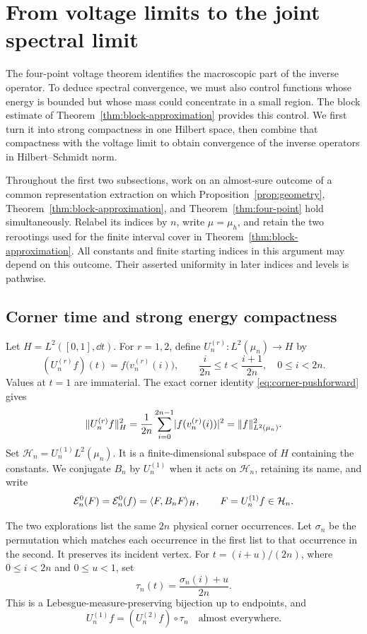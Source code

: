 \section{From voltage limits to the joint spectral limit}\label{sec:spectrum}

The four-point voltage theorem identifies the macroscopic part of the
inverse operator.  To deduce spectral convergence, we must also control
functions whose energy is bounded but whose mass could concentrate in a
small region.  The block estimate of Theorem~\ref{thm:block-approximation}
provides this control.  We first turn it into strong compactness in one
Hilbert space, then combine that compactness with the voltage limit to obtain
convergence of the inverse operators in Hilbert--Schmidt norm.

Throughout the first two subsections, work on an almost-sure outcome of a
common representation extraction on which Proposition~\ref{prop:geometry},
Theorem~\ref{thm:block-approximation}, and Theorem~\ref{thm:four-point}
hold simultaneously.  Relabel its indices by \(n\), write \(\mu=\mu_h\),
and retain the two rerootings used for the finite interval cover in
Theorem~\ref{thm:block-approximation}.  All constants and finite starting
indices in this argument may depend on this outcome.  Their asserted
uniformity in later indices and levels is pathwise.

\subsection{Corner time and strong energy compactness}

Let \(H=L^2([0,1],\dd t)\).  For \(r=1,2\), define
\(U_n^{(r)}:L^2(\mu_n)\to H\) by
\[
 (U_n^{(r)}f)(t)=f\bigl(v_n^{(r)}(i)\bigr),
 \qquad \frac{i}{2n}\le t<\frac{i+1}{2n},\quad 0\le i<2n.
\]
Values at \(t=1\) are immaterial.  The exact corner identity
\eqref{eq:corner-pushforward} gives
\[
 \lVert U_n^{(r)}f\rVert_H^2
 =\frac1{2n}\sum_{i=0}^{2n-1}\lvert f(v_n^{(r)}(i))\rvert^2
 =\lVert f\rVert_{L^2(\mu_n)}^2.
\]
Set \(\mathcal H_n=U_n^{(1)}L^2(\mu_n)\).  It is a finite-dimensional subspace of
\(H\) containing the constants.  We conjugate \(B_n\) by \(U_n^{(1)}\)
when it acts on \(\mathcal H_n\), retaining its name, and write
\[
 \mathcal E_n^0(F)=\mathcal E_n^0(f)
 =\langle F,B_nF\rangle_H,\qquad F=U_n^{(1)}f\in \mathcal H_n.
\]

The two explorations list the same \(2n\) physical corner occurrences.
Let \(\sigma_n\) be the permutation which matches each occurrence in the
first list to that occurrence in the second.  It preserves its incident
vertex.  For \(t=(i+u)/(2n)\), where \(0\le i<2n\) and \(0\le u<1\), set
\[
 \tau_n(t)=\frac{\sigma_n(i)+u}{2n}.
\]
This is a Lebesgue-measure-preserving bijection up to endpoints, and
\begin{equation}\label{eq:tour-transfer}
 U_n^{(1)}f=(U_n^{(2)}f)\circ\tau_n\quad\text{almost everywhere}.
\end{equation}

